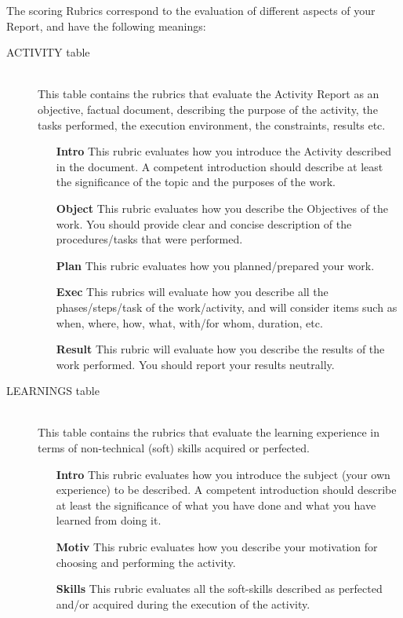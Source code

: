 \documentclass[a4paper,12pt,journal,twoside,compsoc]{PPIEEEtran}
\begin{document}
The scoring Rubrics correspond to the evaluation of different aspects of your Report, and have the following meanings:

\begin{description}
\item[ACTIVITY table]  \hfill \\
This table contains the rubrics that evaluate the Activity Report as an objective, factual document, describing the purpose of the activity, the tasks performed, the execution environment, the constraints, results etc. 
\begin{itemize}
\item[\textbf{Intro}] This rubric evaluates how you introduce the Activity described in the document. A competent introduction should describe at least the significance of the topic and the purposes of the work. 
\item[\textbf{Object}] This rubric evaluates how you describe the Objectives of the work. You should provide clear and concise description of the procedures/tasks that were performed.
\item[\textbf{Plan}] This rubric evaluates how you planned/prepared your work.
\item[\textbf{Exec}] This rubrics will evaluate how you describe all the phases/steps/task of the work/activity, and will consider items such as when, where, how, what, with/for whom, duration, etc.
\item[\textbf{Result}] This rubric will evaluate how you describe the results of the work performed. You should report your results neutrally.
\end{itemize}
\item[LEARNINGS table] \hfill \\
This table contains the rubrics that evaluate the learning experience in terms of non-technical (soft) skills acquired or perfected.
\begin{itemize}
\item[\textbf{Intro}] This rubric evaluates how you introduce the subject (your own experience) to be described. A competent introduction should describe at least the significance of what you have done and what you have learned from doing it.
\item[\textbf{Motiv}] This rubric evaluates how you describe your motivation for choosing and performing the activity.
\item[\textbf{Skills}] This rubric evaluates all the soft-skills described as perfected and/or acquired during the execution of the activity.

\end{itemize}
\end{description}
\end{document}
